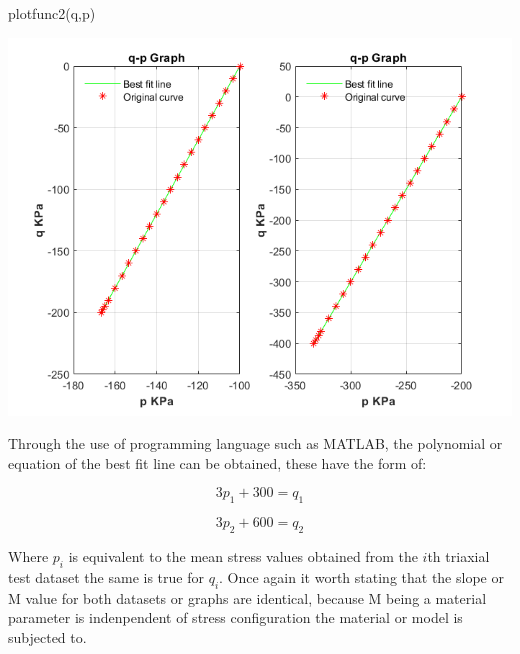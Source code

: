 \documentclass{article}
\begin{document}
\begin{matlabcode}
plotfunc2(q,p)
\end{matlabcode}
\begin{center}
\includegraphics[width=\maxwidth{56.196688409433015em}]{figure_1}
\end{center}

\begin{par}
\begin{flushleft}
Through the use of programming language such as MATLAB, the polynomial or equation of the best fit line can be obtained, these have the form of:
\end{flushleft}
\end{par}

\begin{par}
$$3p_{1}+300=q_{1}$$
\end{par}

\begin{par}
$$3p_{2}+600=q_{2}$$
\end{par}

\begin{par}
\begin{flushleft}
Where $p_{i}$ is equivalent to the mean stress values obtained from the $i$th triaxial test dataset the same is true for $q_{i}$. Once again it worth stating that the slope or M value for both datasets or graphs are identical, because M being a material parameter is indenpendent of stress configuration the material or model is subjected to.
\end{flushleft}
\end{par}
\end{document}
